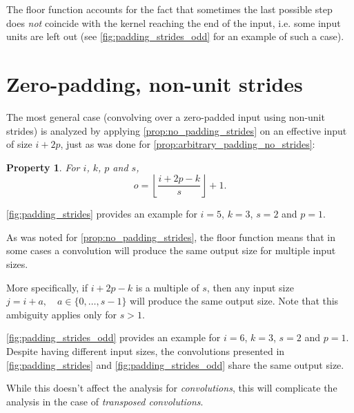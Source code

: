 \documentclass{report}
\newtheorem{prop}{Property}
\begin{document}
The floor function accounts for the fact that sometimes the last possible step
does {\em not} coincide with the kernel reaching the end of the input, i.e.
some input units are left out (see \autoref{fig:padding_strides_odd} for an
example of such a case).

\section{Zero-padding, non-unit strides}

The most general case (convolving over a zero-padded input using non-unit
strides) is analyzed by applying \autoref{prop:no_padding_strides} on an
effective input of size $i + 2p$, just as was done for
\autoref{prop:arbitrary_padding_no_strides}:

\begin{prop}\label{prop:padding_strides}
For $i$, $k$, $p$ and $s$,
\begin{equation*}
    o = \left\lfloor \frac{i + 2p - k}{s} \right\rfloor + 1.
\end{equation*}
\end{prop}

\autoref{fig:padding_strides} provides an example for $i = 5$, $k = 3$, $s = 2$
and $p = 1$.

As was noted for \autoref{prop:no_padding_strides}, the floor function means
that in some cases a convolution will produce the same output size for multiple
input sizes.

More specifically, if $i + 2p - k$ is a multiple of $s$, then any input size $j
= i + a, \quad a \in \{0,\ldots,s - 1\}$ will produce the same output size. Note
that this ambiguity applies only for $s > 1$.

\autoref{fig:padding_strides_odd} provides an example for $i = 6$, $k = 3$, $s =
2$ and $p = 1$. Despite having different input sizes, the convolutions presented
in \autoref{fig:padding_strides} and \autoref{fig:padding_strides_odd} share the
same output size.

While this doesn't affect the analysis for {\em convolutions}, this will
complicate the analysis in the case of {\em transposed convolutions}.
\end{document}
